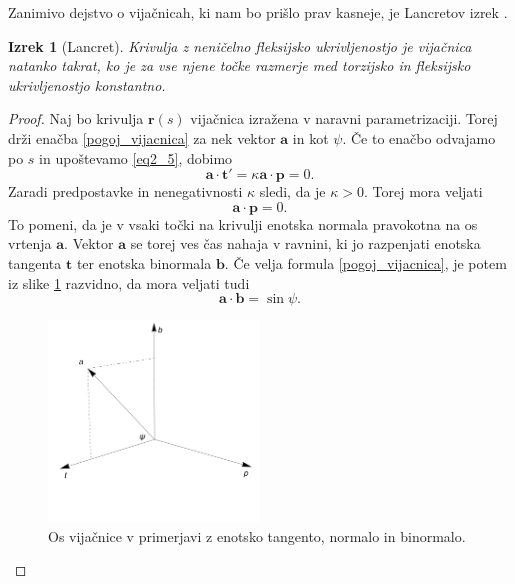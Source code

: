 \documentclass[12pt,a4paper,twoside]{article}
\theoremstyle{definition} %
\theoremstyle{plain} %
\newtheorem{izrek}[definicija]{Izrek}
\theoremstyle{primerstyle}
\numberwithin{equation}{section}  %
\newcommand{\tV}{\mathbf{t}}
\newcommand{\aV}{\mathbf{a}}
\newcommand{\bV}{\mathbf{b}}
\newcommand{\pV}{\mathbf{p}}
\newcommand{\rV}{\mathbf{r}}
\begin{document}
Zanimivo dejstvo o vijačnicah, ki nam bo prišlo prav kasneje, je Lancretov izrek \cite{kreyszig2019differential}.
\begin{izrek}[Lancret]
	\label{lancret}
	Krivulja z neničelno fleksijsko ukrivljenostjo je vijačnica natanko takrat, ko je za vse njene točke razmerje med torzijsko in fleksijsko ukrivljenostjo konstantno.
\end{izrek}
\begin{proof}
	Naj bo krivulja $\rV(s)$ vijačnica izražena v naravni parametrizaciji. Torej drži enačba \eqref{pogoj_vijacnica} za nek vektor $\aV$ in kot $\psi.$ Če to enačbo odvajamo po $s$ in upoštevamo \eqref{eq2_5}, dobimo
	\begin{equation*}
		\aV \cdot \tV'=\kappa \aV \cdot \pV=0.
	\end{equation*}
	Zaradi predpostavke in nenegativnosti $\kappa$ sledi, da je $\kappa > 0.$ Torej mora veljati
	\begin{equation}
	\label{eq4_19}
	\aV \cdot \pV=0.
	\end{equation}
	To pomeni, da je v vsaki točki na krivulji enotska normala pravokotna na os vrtenja $\aV.$ Vektor $\aV$ se torej ves čas nahaja v ravnini, ki jo razpenjati enotska tangenta $\tV$ ter enotska binormala $\bV.$ Če velja formula \eqref{pogoj_vijacnica}, je potem iz slike \ref{fig:lancret} razvidno, da mora veljati tudi
	\begin{equation*}
		\aV \cdot \bV=\sin \psi.
	\end{equation*}
	\begin{figure}[h!]
	  \centering
	  \includegraphics[width=0.5\textwidth]{images/lancret.pdf}
	  \caption[Os vijačnice v primerjavi z enotsko tangento, normalo in binormalo]{Os vijačnice v primerjavi z enotsko tangento, normalo in binormalo.}
	  \label{fig:lancret}
	\end{figure}
	

\end{proof}
\end{document}
